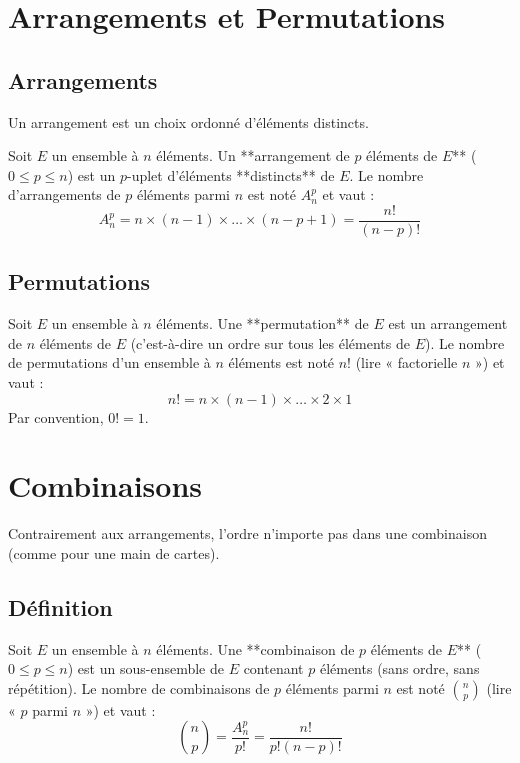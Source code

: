 \section{Arrangements et Permutations}

\subsection{Arrangements}

Un arrangement est un choix ordonné d'éléments distincts.

\begin{definition}[Arrangement]
Soit $E$ un ensemble à $n$ éléments. Un **arrangement de $p$ éléments de $E$** ($0 \le p \le n$) est un $p$-uplet d'éléments **distincts** de $E$.
Le nombre d'arrangements de $p$ éléments parmi $n$ est noté $A_n^p$ et vaut :
\[
A_n^p = n \times (n-1) \times \dots \times (n-p+1) = \frac{n!}{(n-p)!}
\]
\end{definition}

\subsection{Permutations}

\begin{definition}
Soit $E$ un ensemble à $n$ éléments. Une **permutation** de $E$ est un arrangement de $n$ éléments de $E$ (c'est-à-dire un ordre sur tous les éléments de $E$).
Le nombre de permutations d'un ensemble à $n$ éléments est noté $n!$ (lire « factorielle $n$ ») et vaut :
\[
n! = n \times (n-1) \times \dots \times 2 \times 1
\]
Par convention, $0! = 1$.
\end{definition}

\section{Combinaisons}

Contrairement aux arrangements, l'ordre n'importe pas dans une combinaison (comme pour une main de cartes).

\subsection{Définition}

\begin{definition}[Combinaison]
Soit $E$ un ensemble à $n$ éléments. Une **combinaison de $p$ éléments de $E$** ($0 \le p \le n$) est un sous-ensemble de $E$ contenant $p$ éléments (sans ordre, sans répétition).
Le nombre de combinaisons de $p$ éléments parmi $n$ est noté $\binom{n}{p}$ (lire « $p$ parmi $n$ ») et vaut :
\[
\binom{n}{p} = \frac{A_n^p}{p!} = \frac{n!}{p!(n-p)!}
\]
\end{definition}

